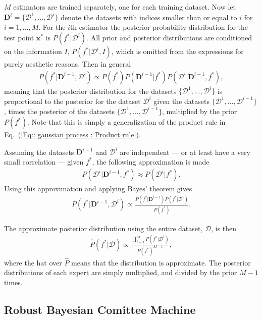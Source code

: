 \documentclass[twoside,english]{uiofysmaster}
\begin{document}
{{$M$ estimators are trained separately, one for each training dataset. Now let $\textbf{D}^{i} = \{ \mathcal{D}^1, ..., \mathcal{D}^i \}$ denote the datasets with indices smaller than or equal to $i$ for $i=1,...,M$. For the $i$th estimator the posterior probability distribution for the test point $\textbf{x}^*$ is $P(f^* | \mathcal{D}^{i})$. All prior and posterior distributions are conditioned on the information $I$, $P(f^* | \mathcal{D}^i, I)$, which is omitted from the expressions for purely aesthetic reasons. Then in general
\begin{align}
P(f^* |  \textbf{D}^{i-1}, \mathcal{D}^i) \propto P(f^*) P(\textbf{D}^{i-1} | f^*) P (\mathcal{D}^i | \textbf{D}^{i-1}, f^*),
\end{align}
meaning that the posterior distribution for the datasets $\{ \mathcal{D}^1,..., \mathcal{D}^i \}$ is proportional to the posterior for the dataset $\mathcal{D}^i$ given the datasets $\{\mathcal{D}^1,..., \mathcal{D}^{i-1} \}$, times the posterior of the datasets $\{ \mathcal{D}^1,..., \mathcal{D}^{i-1}\}$, multiplied by the prior $P(f^*)$. Note that this is simply a generalization of the product rule in Eq.~(\ref{Eq:: gaussian process : Product rule}).

Assuming the datasets $\textbf{D}^{i-1}$ and $\mathcal{D}^i$ are independent --- or at least have a very small correlation --- given $f^*$, the following approximation is made
\begin{align}\label{Eq:: evaluating cross : BCM assumption}
P(\mathcal{D}^i | \textbf{D}^{i-1},f^*) \approx P(\mathcal{D}^i | f^*).
\end{align}
Using this approximation and applying Bayes' theorem gives
\begin{align}
P(f^* | \textbf{D}^{i-1}, \mathcal{D}^i) \propto \frac{P(f^*|\textbf{D}^{i-1}) P(f^* | \mathcal{D}^i)}{P(f^*)}. 
\end{align}

The approximate posterior distribution using the entire dataset, $\mathcal{D}$, is then 
\begin{align}\label{Eq:: evaluating cross : BCM predictive distribution}
\hat{P}(f^* | \mathcal{D}) \propto \frac{\prod_{i=1}^M P(f^*| \mathcal{D}^i)}{P(f^* )^{M-1}} ,
\end{align}
where the hat over $\hat{P}$ means that the distribution is approximate. The posterior distributions of each expert are simply multiplied, and divided by the prior $M-1$ times.

\subsection{Robust Bayesian Comittee Machine}

}}
\end{document}
